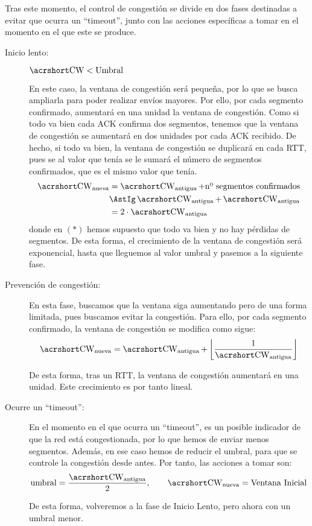 Tras este momento, el control de congestión se divide en dos fases destinadas a evitar que ocurra un ``timeout'', junto con las acciones específicas a tomar en el momento en el que este se produce.
\begin{description}
    \item [Inicio lento:] $\cw < \text{Umbral}$
    
    En este caso, la ventana de congestión será pequeña, por lo que se busca ampliarla para poder realizar envíos mayores. Por ello, por cada segmento confirmado, aumentará en una unidad la ventana de congestión. Como si todo va bien cada \acrshort{ACK} confirma dos segmentos, tenemos que la ventana de congestión se aumentará en dos unidades por cada \acrshort{ACK} recibido. De hecho, si todo va bien, la ventana de congestión se duplicará en cada \acrshort{RTT}, pues se al valor que tenía se le sumará el número de segmentos confirmados, que es el mismo valor que tenía.
    \begin{align*}
        \cw_{\text{nueva}} &= \cw_{\text{antigua}} + \text{nº segmentos confirmados} \\
            &\AstIg \cw_{\text{antigua}} + \cw_{\text{antigua}}\\
            &= 2 \cdot \cw_{\text{antigua}}
    \end{align*}
    donde en $(\ast)$ hemos supuesto que todo va bien y no hay pérdidas de segmentos. De esta forma, el crecimiento de la ventana de congestión será exponencial, hasta que lleguemos al valor umbral y pasemos a la siguiente fase.

    \item [Prevención de congestión:] En esta fase, buscamos que la ventana siga aumentando pero de una forma limitada, pues buscamos evitar la congestión. Para ello, por cada segmento confirmado, la ventana de congestión se modifica como sigue:
    \begin{equation*}
        \cw_{\text{nueva}} = \cw_{\text{antigua}} + \left\lfloor\frac{1}{\cw_{\text{antigua}}}\right\rfloor
    \end{equation*}

    De esta forma, tras un \acrshort{RTT}, la ventana de congestión aumentará en una unidad. Este crecimiento es por tanto lineal.


    \item [Ocurre un ``timeout'':] En el momento en el que ocurra un ``timeout'', es un posible indicador de que la red está congestionada, por lo que hemos de enviar menos segmentos. Además, en ese caso hemos de reducir el umbral, para que se controle la congestión desde antes. Por tanto, las acciones a tomar son:
    \begin{equation*}
        \text{umbral} = \frac{\cw_{\text{antigua}}}{2}, \qquad \cw_{\text{nueva}} = \text{Ventana Inicial}
    \end{equation*}

    De esta forma, volveremos a la fase de Inicio Lento, pero ahora con un umbral menor.
\end{description}

